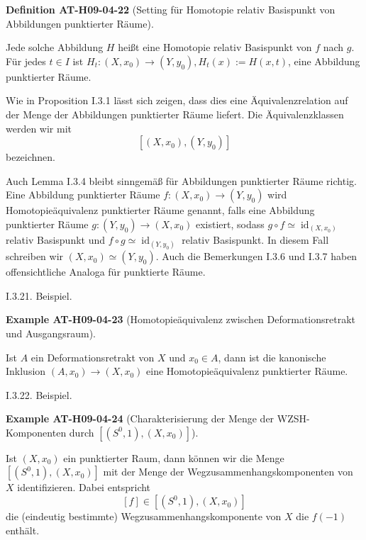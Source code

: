 \documentclass[10pt, letterpaper]{article}
\newcommand{\CustomHeading}[3]{%
  \par\medskip\noindent%
  \textbf{#1 #2} \textnormal{(#3)}.\enskip%
}
\newenvironment{DEF}[2]{\begin{unitbox}\CustomHeading{Definition}{#1}{#2}}{\end{unitbox}}
\newenvironment{EXA}[2]{\begin{unitbox}\CustomHeading{Example}{#1}{#2}}{\end{unitbox}}
\begin{document}
\begin{DEF}{AT-H09-04-22}{Setting für Homotopie relativ Basispunkt von Abbildungen punktierter Räume}
Jede solche Abbildung $H$ heißt eine Homotopie relativ Basispunkt von $f$ nach $g$. Für jedes $t \in I$ ist $H_{t}:\left(X, x_{0}\right) \rightarrow\left(Y, y_{0}\right), H_{t}(x):=H(x, t)$, eine Abbildung punktierter Räume. 

Wie in Proposition I.3.1 lässt sich zeigen, dass dies eine Äquivalenzrelation auf der Menge der Abbildungen punktierter Räume liefert. Die Äquivalenzklassen werden wir mit 
$$\left[\left(X, x_{0}\right),\left(Y, y_{0}\right)\right]$$ 
bezeichnen. 

Auch Lemma I.3.4 bleibt sinngemäß für Abbildungen punktierter Räume richtig. Eine Abbildung punktierter Räume $f:\left(X, x_{0}\right) \rightarrow\left(Y, y_{0}\right)$ wird Homotopieäquivalenz punktierter Räume genannt, falls eine Abbildung punktierter Räume $g:\left(Y, y_{0}\right) \rightarrow\left(X, x_{0}\right)$ existiert, sodass $g \circ f \simeq \operatorname{id}_{\left(X, x_{0}\right)}$ relativ Basispunkt und $f \circ g \simeq \operatorname{id}_{\left(Y, y_{0}\right)}$ relativ Basispunkt. In diesem Fall schreiben wir $\left(X, x_{0}\right) \simeq\left(Y, y_{0}\right)$. Auch die Bemerkungen I.3.6 und I.3.7 haben offensichtliche Analoga für punktierte Räume.
\end{DEF}



I.3.21. Beispiel. 

\begin{EXA}{AT-H09-04-23}{Homotopieäquivalenz zwischen Deformationsretrakt und Ausgangsraum}
Ist $A$ ein Deformationsretrakt von $X$ und $x_{0} \in A$, dann ist die kanonische Inklusion $\left(A, x_{0}\right) \rightarrow\left(X, x_{0}\right)$ eine Homotopieäquivalenz punktierter Räume.
\end{EXA}


I.3.22. Beispiel. 


\begin{EXA}{AT-H09-04-24}{Charakterisierung der Menge der WZSH-Komponenten durch  $\left[\left(S^{0}, 1\right),\left(X, x_{0}\right)\right]$}
Ist $(X, x_{0})$ ein punktierter Raum, dann können wir die Menge $\left[\left(S^{0}, 1\right),\left(X, x_{0}\right)\right]$ mit der Menge der Wegzusammenhangskomponenten von $X$ identifizieren. Dabei entspricht 
$$[f] \in\left[\left(S^{0}, 1\right),\left(X, x_{0}\right)\right]$$ 
die (eindeutig bestimmte) Wegzusammenhangskomponente von $X$ die $f(-1)$ enthält.
\end{EXA}
\end{document}
